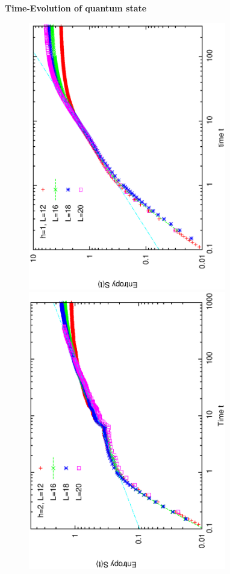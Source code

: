 \documentclass[prl,aps,epsf,showpacs,twocolumn]{revtex4}
\begin{document}
{\bf Time-Evolution of quantum state}



\begin{figure}[b]
  \includegraphics[angle=-90,width=3.4in]{newfig1c.ps}\\
  \vspace{-0.10in}
  \includegraphics[angle=-90,width=3.4in]{newfig1d.ps}\\

\end{figure}
\end{document}
